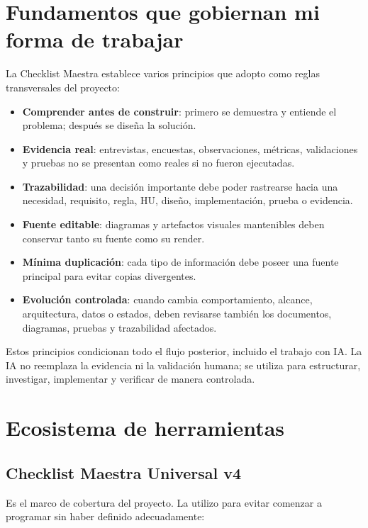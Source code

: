 \documentclass[11pt,a4paper]{article}
\begin{document}
\section{Fundamentos que gobiernan mi forma de trabajar}

La Checklist Maestra establece varios principios que adopto como reglas transversales del proyecto:

\begin{itemize}
    \item \textbf{Comprender antes de construir}: primero se demuestra y entiende el problema; después se diseña la solución.
    \item \textbf{Evidencia real}: entrevistas, encuestas, observaciones, métricas, validaciones y pruebas no se presentan como reales si no fueron ejecutadas.
    \item \textbf{Trazabilidad}: una decisión importante debe poder rastrearse hacia una necesidad, requisito, regla, HU, diseño, implementación, prueba o evidencia.
    \item \textbf{Fuente editable}: diagramas y artefactos visuales mantenibles deben conservar tanto su fuente como su render.
    \item \textbf{Mínima duplicación}: cada tipo de información debe poseer una fuente principal para evitar copias divergentes.
    \item \textbf{Evolución controlada}: cuando cambia comportamiento, alcance, arquitectura, datos o estados, deben revisarse también los documentos, diagramas, pruebas y trazabilidad afectados.
\end{itemize}

Estos principios condicionan todo el flujo posterior, incluido el trabajo con IA. La IA no reemplaza la evidencia ni la validación humana; se utiliza para estructurar, investigar, implementar y verificar de manera controlada.

\section{Ecosistema de herramientas}

\subsection{Checklist Maestra Universal v4}

Es el marco de cobertura del proyecto. La utilizo para evitar comenzar a programar sin haber definido adecuadamente:
\end{document}
